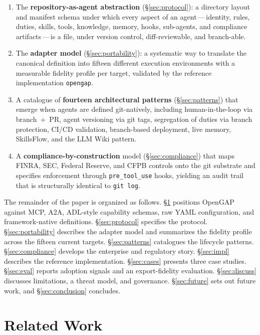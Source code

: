 \documentclass[11pt,a4paper]{article}
\begin{document}
\begin{enumerate}
  \item The \textbf{repository-as-agent abstraction} (\S\ref{sec:protocol}): a directory
  layout and manifest schema under which every aspect of an agent\,---\,identity,
  rules, duties, skills, tools, knowledge, memory, hooks, sub-agents, and compliance
  artifacts\,---\,is a file, under version control, diff-reviewable, and branch-able.
  \item The \textbf{adapter model} (\S\ref{sec:portability}): a systematic way to
  translate the canonical definition into fifteen different execution environments with
  a measurable fidelity profile per target, validated by the reference implementation
  \texttt{opengap}.
  \item A catalogue of \textbf{fourteen architectural patterns}
  (\S\ref{sec:patterns}) that emerge when agents are defined git-natively, including
  human-in-the-loop via branch~+~PR, agent versioning via git tags, segregation of
  duties via branch protection, CI/CD validation, branch-based deployment, live memory,
  SkillsFlow, and the LLM Wiki pattern.
  \item A \textbf{compliance-by-construction} model (\S\ref{sec:compliance}) that maps
  FINRA, SEC, Federal Reserve, and CFPB controls onto the git substrate and specifies
  enforcement through \texttt{pre\_tool\_use} hooks, yielding an audit trail that is
  structurally identical to \texttt{git log}.
\end{enumerate}

The remainder of the paper is organized as follows.
\S\ref{sec:related} positions OpenGAP against MCP, A2A, ADL-style capability
schemas, raw YAML configuration, and framework-native definitions.
\S\ref{sec:protocol} specifies the protocol.
\S\ref{sec:portability} describes the adapter model and summarizes the fidelity
profile across the fifteen current targets.
\S\ref{sec:patterns} catalogues the lifecycle patterns.
\S\ref{sec:compliance} develops the enterprise and regulatory story.
\S\ref{sec:impl} describes the reference implementation.
\S\ref{sec:cases} presents three case studies.
\S\ref{sec:eval} reports adoption signals and an export-fidelity evaluation.
\S\ref{sec:discuss} discusses limitations, a threat model, and governance.
\S\ref{sec:future} sets out future work, and \S\ref{sec:conclusion} concludes.

\section{Related Work}\label{sec:related}
\end{document}
